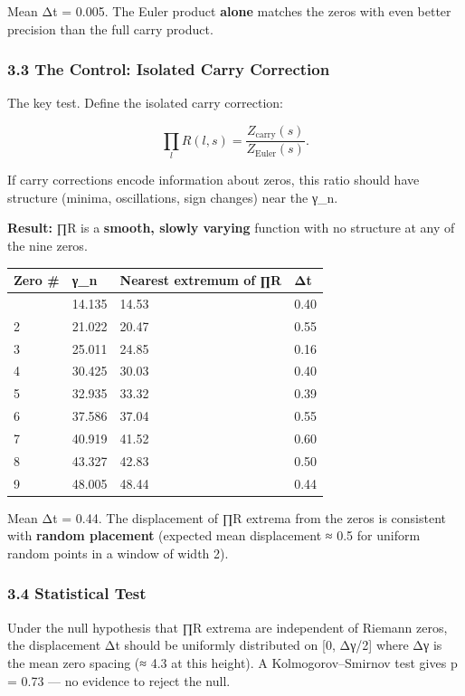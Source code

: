 \documentclass[
  11pt,
]{article}
\begin{document}
Mean Δt = 0.005. The Euler product \textbf{alone} matches the zeros with even
better precision than the full carry product.

\subsubsection{3.3 The Control: Isolated Carry
Correction}\label{the-control-isolated-carry-correction}

The key test. Define the isolated carry correction:

\[\prod_{l} R(l, s) = \frac{Z_{\text{carry}}(s)}{Z_{\text{Euler}}(s)}.\]

If carry corrections encode information about zeros, this ratio should have
structure (minima, oscillations, sign changes) near the γ\_n.

\textbf{Result:} ∏R is a \textbf{smooth, slowly varying} function with no
structure at any of the nine zeros.

\begin{longtable}[]{@{}llll@{}}
\toprule\noalign{}
Zero \# & γ\_n & Nearest extremum of ∏R & Δt \\
\midrule\noalign{}
\endhead
\bottomrule\noalign{}
\endlastfoot
1 & 14.135 & 14.53 & 0.40 \\
2 & 21.022 & 20.47 & 0.55 \\
3 & 25.011 & 24.85 & 0.16 \\
4 & 30.425 & 30.03 & 0.40 \\
5 & 32.935 & 33.32 & 0.39 \\
6 & 37.586 & 37.04 & 0.55 \\
7 & 40.919 & 41.52 & 0.60 \\
8 & 43.327 & 42.83 & 0.50 \\
9 & 48.005 & 48.44 & 0.44 \\
\end{longtable}

Mean Δt = 0.44. The displacement of ∏R extrema from the zeros is consistent with
\textbf{random placement} (expected mean displacement ≈ 0.5 for uniform random
points in a window of width 2).

\subsubsection{3.4 Statistical Test}\label{statistical-test}

Under the null hypothesis that ∏R extrema are independent of Riemann zeros, the
displacement Δt should be uniformly distributed on {[}0, Δγ/2{]} where Δγ is the
mean zero spacing (≈ 4.3 at this height). A Kolmogorov--Smirnov test gives p =
0.73 --- no evidence to reject the null.
\end{document}
